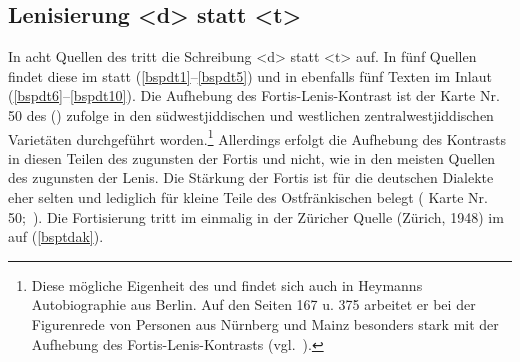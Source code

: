 { \subsection{Lenisierung <d> statt <t>}\label{td}
In acht Quellen des  tritt die Schreibung <d> statt <t> auf. In fünf Quellen findet diese  im  statt (\ref{bspdt1}–\ref{bspdt5}) und in ebenfalls fünf Texten im Inlaut (\ref{bspdt6}–\ref{bspdt10}). Die Aufhebung des Fortis-Lenis-Kontrast ist der Karte Nr. 50 des  (\citeyear[99]{Herzog1992}) zufolge in den südwestjiddischen und westlichen zentralwestjiddischen Varietäten durchgeführt worden.\footnote{Diese mögliche Eigenheit des \hai{{\SWJ}} und  findet sich auch in Heymanns Autobiographie aus Berlin. Auf den Seiten 167 u. 375 arbeitet er bei der Figurenrede von Personen aus Nürnberg und Mainz besonders stark mit der Aufhebung des Fortis-Lenis-Kontrasts (vgl.\, \citealt[33f]{Schaefer2010}).} Allerdings erfolgt die Aufhebung des Kontrasts in diesen Teilen des \hai{{\WJ}} zugunsten der Fortis und nicht, wie in den meisten Quellen des  zugunsten der Lenis. Die Stärkung der Fortis ist für die deutschen Dialekte eher selten und lediglich für kleine Teile des Ostfränkischen belegt ( Karte Nr. 50;\, \citealt[63]{Fink1930}). Die Fortisierung tritt im  einmalig in der Züricher Quelle  (Zürich, 1948) im  auf (\ref{bsptdak}).
 

 }
